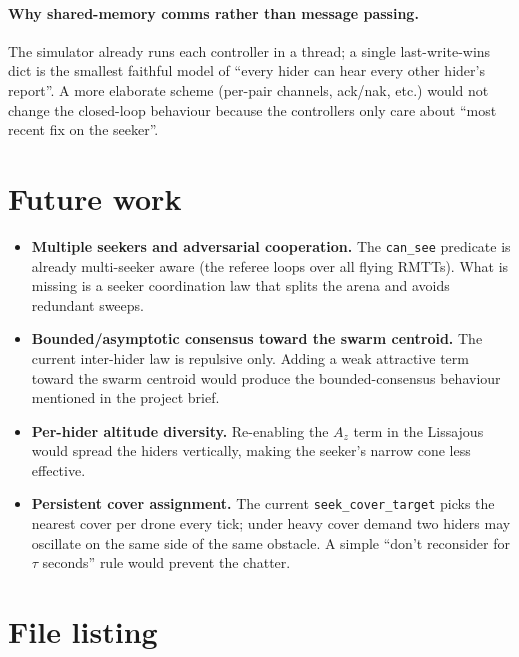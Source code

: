 \documentclass[11pt,a4paper]{article}
\newcommand{\code}[1]{\texttt{#1}}
\begin{document}
\paragraph{Why shared-memory comms rather than message passing.}
The simulator already runs each controller in a thread; a single
last-write-wins dict is the smallest faithful model of ``every hider can hear
every other hider's report''. A more elaborate scheme (per-pair channels,
ack/nak, etc.) would not change the closed-loop behaviour because the
controllers only care about ``most recent fix on the seeker''.

\section{Future work}

\begin{itemize}[leftmargin=1.4em]
  \item \textbf{Multiple seekers and adversarial cooperation.} The
        \code{can\_see} predicate is already multi-seeker aware (the referee
        loops over all flying RMTTs). What is missing is a seeker
        coordination law that splits the arena and avoids redundant sweeps.
  \item \textbf{Bounded/asymptotic consensus toward the swarm centroid.}
        The current inter-hider law is repulsive only. Adding a weak
        attractive term toward the swarm centroid would produce the
        bounded-consensus behaviour mentioned in the project brief.
  \item \textbf{Per-hider altitude diversity.} Re-enabling the $A_z$ term in
        the Lissajous would spread the hiders vertically, making the seeker's
        narrow cone less effective.
  \item \textbf{Persistent cover assignment.} The current
        \code{seek\_cover\_target} picks the nearest cover per drone every
        tick; under heavy cover demand two hiders may oscillate on the same
        side of the same obstacle. A simple ``don't reconsider for $\tau$
        seconds'' rule would prevent the chatter.
\end{itemize}

\appendix
\section{File listing}
\end{document}
